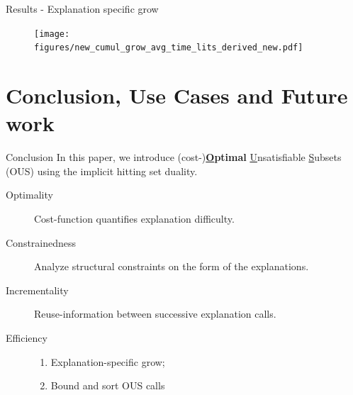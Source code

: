 \documentclass{beamer}
\renewcommand\emph[1]{{\color{vuborange}#1}}
\begin{document}
\begin{frame}{Results - Explanation specific grow}
	\begin{figure}
		\texttt{[image: figures/new\_cumul\_grow\_avg\_time\_lits\_derived\_new.pdf]}
	\end{figure}
\end{frame}

\section{Conclusion, Use Cases and Future work}
\begin{frame}{Conclusion}
	In this paper, we introduce (cost-)\textbf{\underline{O}ptimal} \underline{U}nsatisfiable \underline{S}ubsets (OUS) using the \emph{implicit hitting set duality}.
	\begin{description}
		\item[Optimality] Cost-function quantifies explanation difficulty. \pause
		\item[Constrainedness] Analyze structural constraints on the form of the explanations.\pause
		\item[Incrementality] Reuse-information between successive explanation calls.\pause
		\item[Efficiency] 
		\begin{enumerate}
			\item Explanation-specific grow;
			\item Bound and sort OUS calls
		\end{enumerate}
		
	\end{description}
\end{frame}
\end{document}
